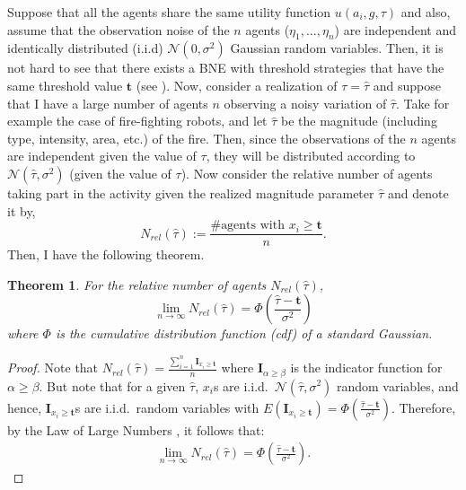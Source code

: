 \documentclass[defaultstyle,12pt]{thesis}
\newtheorem{theorem}{Theorem}
\newcommand{\td}{\mathbf{t}}   %
\begin{document}
Suppose that all the agents share the same utility function $u(a_i,g,\tau)$ and also, assume that the observation noise of the $n$ agents ($\eta_1,\ldots,\eta_n$) are independent and identically distributed (i.i.d) $\mathcal{N}(0,\sigma^2)$ Gaussian random variables. Then, it is not hard to see that there exists a BNE with threshold strategies that have the same threshold value $\td$ (see  \cite{Morris2000}). Now, consider a realization of $\tau=\hat{\tau}$ and suppose that I have a large number of agents $n$ observing a noisy variation of $\hat{\tau}$. Take for example the case of fire-fighting robots, and let $\hat{\tau}$ be the magnitude (including type, intensity, area, etc.) of the fire. Then, since the observations of the $n$ agents are independent given the value of $\tau$, they will be distributed according to $\mathcal{N}(\hat{\tau},\sigma^2)$ (given the value of $\tau$). Now consider the relative number of agents taking part in the activity given the realized magnitude parameter $\hat{\tau}$ and denote it by,
\begin{equation}\label{eqn:Nrel}
	N_{rel}(\hat{\tau}):=\frac{\#\text{agents with }x_i\geq \td}{n}.
\end{equation}
Then, I have the following theorem.

\begin{theorem}\label{thrm:relativefrequency}
For the relative number of agents $N_{rel}(\hat{\tau})$,
\begin{equation}
\lim_{n\to\infty}N_{rel}(\hat{\tau})=\Phi(\frac{\hat{\tau}-\td}{\sigma^2})
\end{equation}
where $\Phi$ is the cumulative distribution function (cdf) of a standard Gaussian. 
\end{theorem}
\begin{proof}
Note that $N_{rel}(\hat{\tau})=\frac{\sum_{i=1}^n\mathbf{I}_{x_i\geq \td}}{n}$ where $\mathbf{I}_{\alpha\geq \beta}$ is the indicator function for $\alpha\geq \beta$. But note that for a given $\hat{\tau}$, $x_i$s are i.i.d.\ $\mathcal{N}(\hat{\tau},\sigma^2)$ random variables, and hence, $\mathbf{I}_{x_i\geq \td}$s are i.i.d.\ random variables with $E(\mathbf{I}_{x_i\geq \td})=\Phi(\frac{\hat{\tau}-\td}{\sigma^2})$. Therefore, by the Law of Large Numbers \cite{durrett2010}, it follows that:
\vspace{-5px}
\begin{align*}
\lim_{n\to\infty}N_{rel}(\hat{\tau})=\Phi(\frac{\hat{\tau}-\td}{\sigma^2}).
\end{align*}
\vspace{-5px}
\end{proof}
\end{document}
